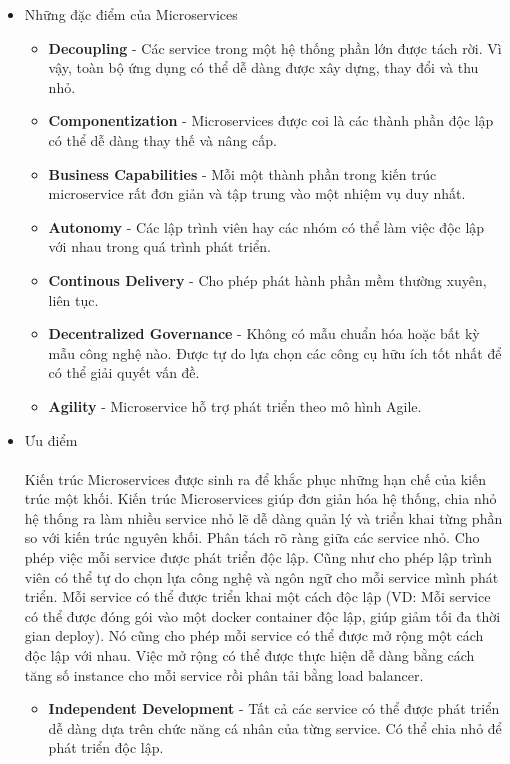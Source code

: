         \begin{itemize}
            \item Những đặc điểm của Microservices
            \begin{itemize}
                \item \textbf{Decoupling} - Các service trong một hệ thống phần lớn được tách rời. Vì vậy, toàn bộ ứng dụng có thể dễ dàng được xây dựng, thay đổi và thu nhỏ.
                \item \textbf{Componentization} - Microservices được coi là các thành phần độc lập có thể dễ dàng thay thế và nâng cấp.
                \item \textbf{Business Capabilities} - Mỗi một thành phần trong kiến trúc microservice rất đơn giản và tập trung vào một nhiệm vụ duy nhất.
                \item \textbf{Autonomy} - Các lập trình viên hay các nhóm có thể làm việc độc lập với nhau trong quá trình phát triển.
                \item \textbf{Continous Delivery} - Cho phép phát hành phần mềm thường xuyên, liên tục.
                \item \textbf{Decentralized Governance} - Không có mẫu chuẩn hóa hoặc bất kỳ mẫu công nghệ nào. Được tự do lựa chọn các công cụ hữu ích tốt nhất để có thể giải quyết vấn đề.
                \item \textbf{Agility} - Microservice hỗ trợ phát triển theo mô hình Agile.
            \end{itemize}
            \item Ưu điểm\\\\
            Kiến trúc Microservices được sinh ra để khắc phục những hạn chế của kiến trúc một khối. Kiến trúc Microservices giúp đơn giản hóa hệ thống, chia nhỏ hệ thống ra làm nhiều service nhỏ lẽ dễ dàng quản lý và triển khai từng phần so với kiến trúc nguyên khối. Phân tách rõ ràng giữa các service nhỏ. Cho phép việc mỗi service được phát triển độc lập. Cũng như cho phép lập trình viên có thể tự do chọn lựa công nghệ và ngôn ngữ cho mỗi service mình phát triển. Mỗi service có thể được triển khai một cách độc lập (VD: Mỗi service có thể được đóng gói vào một docker container độc lập, giúp giảm tối đa thời gian deploy). Nó cũng cho phép mỗi service có thể được mở rộng một cách độc lập với nhau. Việc mở rộng có thể được thực hiện dễ dàng bằng cách tăng số instance cho mỗi service rồi phân tải bằng load balancer.
            \begin{itemize}
                \item \textbf{Independent Development} - Tất cả các service có thể được phát triển dễ dàng dựa trên chức năng cá nhân của từng service. Có thể chia nhỏ để phát triển độc lập.

\end{itemize}
\end{itemize}
